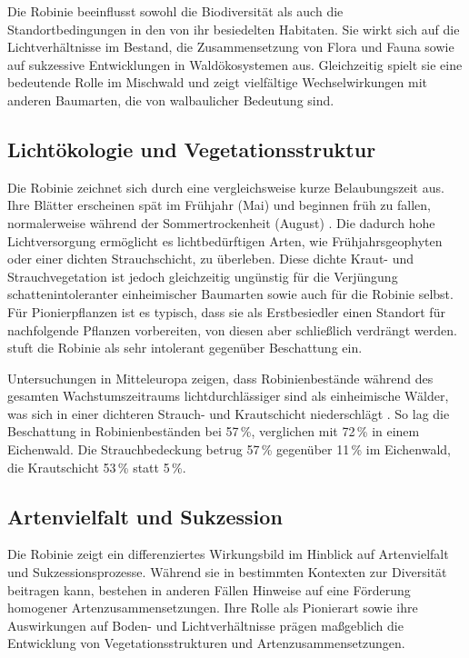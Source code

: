 \documentclass[twocolumn]{scrartcl}
\begin{document}
Die Robinie beeinflusst sowohl die Biodiversität als auch die
Standortbedingungen in den von ihr besiedelten Habitaten. Sie wirkt
sich auf die Lichtverhältnisse im Bestand, die Zusammensetzung von
Flora und Fauna sowie auf sukzessive Entwicklungen in Waldökosystemen
aus. Gleichzeitig spielt sie eine bedeutende Rolle im Mischwald und
zeigt vielfältige Wechselwirkungen mit anderen Baumarten, die von
walbaulicher Bedeutung sind.

\subsection{Lichtökologie und Vegetationsstruktur}

Die Robinie zeichnet sich durch eine vergleichsweise kurze
Belaubungszeit aus. Ihre Blätter erscheinen spät im Frühjahr (Mai) und
beginnen früh zu fallen, normalerweise während der Sommertrockenheit
(August) \citep{vitkova2017robinie}. Die dadurch hohe Lichtversorgung
ermöglicht es lichtbedürftigen Arten, wie Frühjahrsgeophyten oder
einer dichten Strauchschicht, zu überleben. Diese dichte Kraut- und
Strauchvegetation ist jedoch gleichzeitig ungünstig für die Verjüngung
schattenintoleranter einheimischer Baumarten sowie auch für die
Robinie selbst. Für Pionierpflanzen ist es typisch, dass sie als
Erstbesiedler einen Standort für nachfolgende Pflanzen vorbereiten,
von diesen aber schließlich verdrängt
werden. \citet{baker1949schattentoleranz} stuft die Robinie als sehr
intolerant gegenüber Beschattung ein.

Untersuchungen in Mitteleuropa zeigen, dass Robinienbestände während
des gesamten Wachstumszeitraums lichtdurchlässiger sind als
einheimische Wälder, was sich in einer dichteren Strauch- und
Krautschicht niederschlägt \citep{hanzelka2015robinie}. So lag die
Beschattung in Robinienbeständen bei 57\,\%, verglichen mit 72\,\% in
einem Eichenwald. Die Strauchbedeckung betrug 57\,\% gegenüber 11\,\%
im Eichenwald, die Krautschicht 53\,\% statt 5\,\%.

\subsection{Artenvielfalt und Sukzession}

Die Robinie zeigt ein differenziertes Wirkungsbild im Hinblick auf
Artenvielfalt und Sukzessionsprozesse. Während sie in bestimmten
Kontexten zur Diversität beitragen kann, bestehen in anderen Fällen
Hinweise auf eine Förderung homogener Artenzusammensetzungen. Ihre
Rolle als Pionierart sowie ihre Auswirkungen auf Boden- und
Lichtverhältnisse prägen maßgeblich die Entwicklung von
Vegetationsstrukturen und Artenzusammensetzungen.
\end{document}
